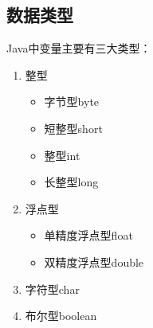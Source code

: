 \vspace{0.5cm}

\subsection{数据类型}

Java中变量主要有三大类型：

\begin{enumerate}
	\item 整型
	      \begin{itemize}
		      \item 字节型byte
		      \item 短整型short
		      \item 整型int
		      \item 长整型long
	      \end{itemize}

	\item 浮点型
	      \begin{itemize}
		      \item 单精度浮点型float
		      \item 双精度浮点型double
	      \end{itemize}

	\item 字符型char

	\item 布尔型boolean
\end{enumerate}

\begin{table}[H]
	\centering
	\caption{不同数据类型的取值范围}
\end{table}


